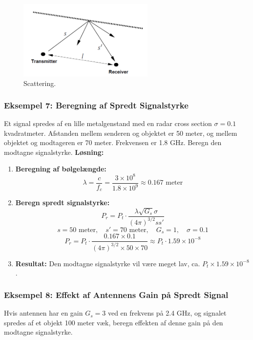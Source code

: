 \documentclass[a4paper,12pt]{book}
\begin{document}
	\begin{figure}[!h]
		\centering
		\includegraphics[width=0.6\textwidth]{fig/fig8.png}
		\caption{Scattering.}
		\label{fig:scattering}
	\end{figure}

	\subsubsection{Eksempel 7: Beregning af Spredt Signalstyrke}
	\noindent Et signal spredes af en lille metalgenstand med en radar cross section \( \sigma = 0.1 \) kvadratmeter. Afstanden mellem senderen og objektet er 50 meter, og mellem objektet og modtageren er 70 meter. Frekvensen er 1.8 GHz. Beregn den modtagne signalstyrke.
	\noindent \textbf{Løsning:}
	\begin{enumerate}
		\item \textbf{Beregning af bølgelængde:} 
		\[
		\lambda = \frac{c}{f_c} = \frac{3 \times 10^8}{1.8 \times 10^9} \approx 0.167 \text{ meter}
		\]
		\item \textbf{Beregn spredt signalstyrke:}
		\[
		P_r = P_t \cdot \frac{\lambda \sqrt{G_s} \sigma}{(4\pi)^{3/2}ss'} 
		\]
		\[
		s = 50 \text{ meter}, \quad s' = 70 \text{ meter}, \quad G_s = 1, \quad \sigma = 0.1
		\]
		\[
		P_r = P_t \cdot \frac{0.167 \times 0.1}{(4\pi)^{3/2} \times 50 \times 70} \approx P_t \cdot 1.59 \times 10^{-8}
		\]
		\item \textbf{Resultat:} Den modtagne signalstyrke vil være meget lav, ca. \( P_t \times 1.59 \times 10^{-8} \).
	\end{enumerate}
	
	\subsubsection{Eksempel 8: Effekt af Antennens Gain på Spredt Signal}
	\noindent Hvis antennen har en gain \( G_s = 3 \) ved en frekvens på 2.4 GHz, og signalet spredes af et objekt 100 meter væk, beregn effekten af denne gain på den modtagne signalstyrke.
	
\end{document}
